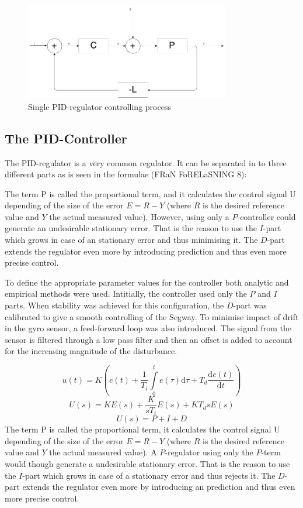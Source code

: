 \begin{figure}[h]
    \label{1}
    \centering
    \includegraphics[width=0.8\textwidth]{process_one_regul.png}
    \caption{Single PID-regulator controlling process}
\end{figure}
\subsection{The PID-Controller}

The PID-regulator is a very common regulator. It can be separated in to three different parts as is seen in the formulae (FRaN FoRELaSNING 8):

The term P is called the proportional term, and it calculates the control signal U depending of the size of the error $E = R - Y$ (where $R$ is the desired reference value and $Y$ the actual measured value). However, using only a $P$-controller could generate an undesirable stationary error. That is the reason to use the $I$-part which grows in case of an stationary error and thus minimising it. The $D$-part extends the regulator even more by introducing prediction and thus even more precise control.

To define the appropriate parameter values for the controller both analytic and empirical methods were used. Intitially, the controller used only the $P$ and $I$ parts. When stability was achieved for this configuration, the $D$-part was calibrated to give a smooth controlling of the Segway. To minimise impact of drift in the gyro sensor, a feed-forward loop was also introduced. The signal from the sensor is filtered through a low pass filter and then an offset is added to account for the increasing magnitude of the disturbance.

\begin{equation}
   u(t) = K(e(t) + \frac{1}{T_i}\int\limits_0^t e(\tau) \mathrm{d}\tau + T_d\frac{\mathrm d e(t)}{\mathrm d t})
\end{equation}
\begin{equation}
   U(s) = KE(s) +  \frac{K}{sT_i}E(s) + KT_d s E(s)
\end{equation}
\begin{equation}
   U(s) = P +  I + D
\end{equation}
The term P is called the proportional term, it calculates the control signal U depending of the size of the error $E = R - Y$ (where $R$ is the desired reference value and $Y$ the actual measured value). A $P$-regulator using only the $P$-term would though generate a undesirable stationary error. That is the reason to use the $I$-part which grows in case of a stationary error and thus rejects it. The $D$-part extends the regulator even more by introducing an prediction and thus even more precise control.

